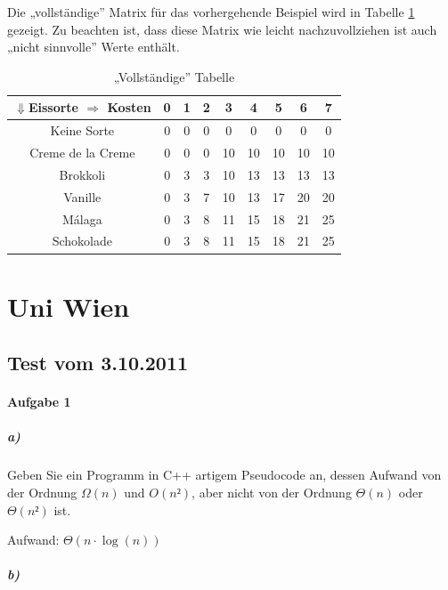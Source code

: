 \documentclass[a4paper, 12pt]{article}
\begin{document}
Die „vollständige” Matrix für das vorhergehende Beispiel wird in Tabelle
\ref{table:Vollstaendig} gezeigt. Zu beachten ist, dass diese Matrix wie
leicht nachzuvollziehen ist auch „nicht sinnvolle” Werte enthält.

\begin{table}[H]
	\begin{center}
		\begin{tabular}{c|cccccccc}
			$⇓$Eissorte $⇒$ Kosten & 0 & 1 & 2 & 3 & 4 & 5 &
			6 & 7\\
			\hline
			Keine Sorte			& 0 & 0 & 0 & 0	 &	0 &	 0 & 0 & 0	 \\
			Creme de la Creme	& 0 & 0 & 0 & 10 & 10 & 10 & 10 & 10 \\
			Brokkoli			& 0 & 3 & 3 & 10 & 13 & 13 & 13 & 13 \\
			Vanille				& 0 & 3 & 7 & 10 & 13 & 17 & 20 & 20 \\
			Málaga				& 0 & 3 & 8 & 11 & 15 & 18 & 21 & 25 \\
			Schokolade			& 0 & 3 & 8 & 11 & 15 & 18 & 21 & 25 \\
		\end{tabular}
	\end{center}
\caption{„Vollständige” Tabelle}
\label{table:Vollstaendig}
\end{table}

\section{Uni Wien}

\subsection{Test vom 3.10.2011}

\paragraph{Aufgabe 1}

\subparagraph{a)} Geben Sie ein Programm in C++ artigem Pseudocode an, dessen
Aufwand von der Ordnung $Ω(n)$ und $O(n²)$, aber nicht von der Ordnung $Θ(n)$
oder $Θ(n²)$ ist.

\begin{leftbar}
	
\end{leftbar}

Aufwand: $Θ\left(n·\log\left(n\right)\right)$

\subparagraph{b)}
\end{document}
